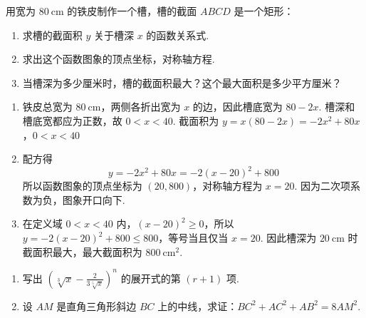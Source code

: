 \begin{problem}
用宽为 \(80 \mathrm{~cm}\) 的铁皮制作一个槽，槽的截面 \(ABCD\) 是一个矩形：

\begin{enumerate}
    \item 求槽的截面积 \(y\) 关于槽深 \(x\) 的函数关系式.
    \item 求出这个函数图象的顶点坐标，对称轴方程.
    \item 当槽深为多少厘米时，槽的截面积最大？这个最大面积是多少平方厘米？
\end{enumerate}

\end{problem}

\begin{solution}
\begin{enumerate}
\item 铁皮总宽为 \(80\mathrm{~cm}\)，两侧各折出宽为 \(x\) 的边，因此槽底宽为 \(80-2x\). 槽深和槽底宽都应为正数，故 \(0<x<40\). 截面积为
\(y=x\left(80-2x\right)=-2x^2+80x\)，\(0<x<40\)

\item 配方得
\[
y=-2x^2+80x=-2\left(x-20\right)^2+800
\]
所以函数图象的顶点坐标为 \(\left(20,800\right)\)，对称轴方程为 \(x=20\). 因为二次项系数为负，图象开口向下.

\item 在定义域 \(0<x<40\) 内，\(\left(x-20\right)^2\geqslant0\)，所以 \(y=-2\left(x-20\right)^2+800\leqslant800\)，等号当且仅当 \(x=20\). 因此槽深为 \(20\mathrm{~cm}\) 时截面积最大，最大截面积为 \(800\mathrm{~cm}^2\).
\end{enumerate}
\end{solution}

\begin{problem}
\begin{enumerate}
    \item 写出 \(\left( \sqrt[3]{x}-\frac{2}{3\sqrt[5]{x}} \right)^n\) 的展开式的第 \(\left( r+1 \right)\) 项.
    \item 设 \(AM\) 是直角三角形斜边 \(BC\) 上的中线，求证：\(BC^2+AC^2+AB^2=8AM^2\).
\end{enumerate}

\end{problem}

